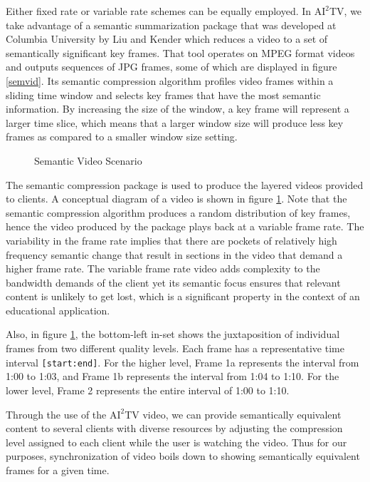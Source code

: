 \documentclass{sig-alternate}
\begin{document}
Either fixed rate or variable rate schemes can be equally employed. In
$\mathrm{AI}^2$TV, we take advantage of a semantic summarization
package that was developed at Columbia University by Liu and Kender
\cite{TIECHENG} which reduces a video to a set of semantically
significant key frames.  That tool operates on MPEG format videos and
outputs sequences of JPG frames, some of which are displayed in figure
\ref{semvid}.  Its semantic compression algorithm profiles video
frames within a sliding time window and selects key frames that have
the most semantic information.  By increasing the size of the window,
a key frame will represent a larger time slice, which means that a
larger window size will produce less key frames as compared to a
smaller window size setting.

\begin{figure}
  \centering
  \caption{Semantic Video Scenario}
  \label{sem_video}
\end{figure} 

The semantic compression package is used to produce the layered videos
provided to clients.  A conceptual diagram of a video is shown in
figure \ref{sem_video}.  Note that the semantic compression algorithm
produces a random distribution of key frames, hence the video produced
by the package plays back at a variable frame rate.  The variability
in the frame rate implies that there are pockets of relatively high
frequency semantic change that result in sections in the video that
demand a higher frame rate.  The variable frame rate video adds
complexity to the bandwidth demands of the client yet its semantic
focus ensures that relevant content is unlikely to get lost, which is
a significant property in the context of an educational application.

Also, in figure \ref{sem_video}, the bottom-left in-set shows the
juxtaposition of individual frames from two different quality levels.
Each frame has a representative time interval \texttt{[start:end]}.
For the higher level, Frame 1a represents the interval from 1:00 to
1:03, and Frame 1b represents the interval from 1:04 to 1:10.  For the
lower level, Frame 2 represents the entire interval of 1:00 to 1:10.

Through the use of the $\mathrm{AI}^2$TV video, we can provide
semantically equivalent content to several clients with diverse
resources by adjusting the compression level assigned to each client
while the user is watching the video.  Thus for our purposes,
synchronization of video boils down to showing semantically equivalent
frames for a given time.
\end{document}
